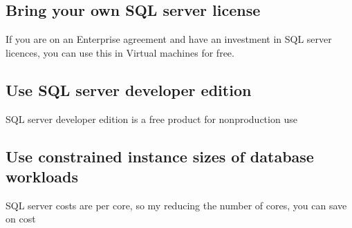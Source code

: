 \documentclass{article}[18pt]
\begin{document}
\subsection{Bring your own SQL server license}
If you are on an Enterprise agreement and have an investment in SQL server licences, you can use this in Virtual machines for free. 
\subsection{Use SQL server developer edition}
SQL server developer edition is a free product for nonproduction use
\subsection{Use constrained instance sizes of database workloads}
SQL server costs are per core, so my reducing the number of cores, you can save on cost
\end{document}
